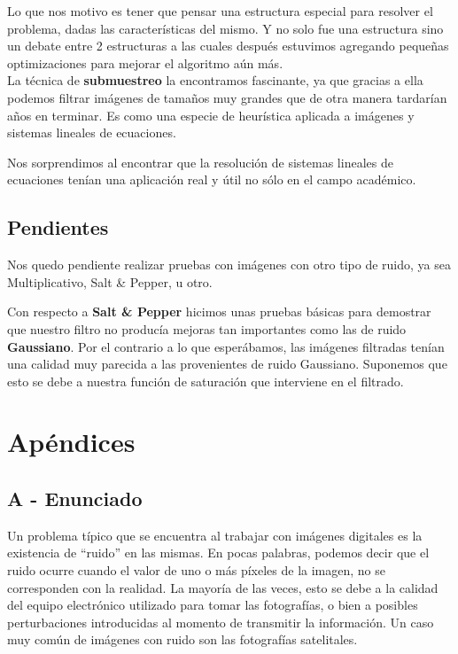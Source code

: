 \documentclass[a4paper]{article}
\begin{document}
Lo que nos motivo es tener que pensar una estructura especial para resolver el problema, dadas las características del mismo. Y no solo fue una estructura sino un debate entre 2 estructuras a las cuales después estuvimos agregando pequeñas optimizaciones para mejorar el algoritmo aún más. \\ 

La técnica de \textbf{submuestreo} la encontramos fascinante, ya que gracias a ella podemos filtrar imágenes de tamaños muy grandes que de otra manera tardarían años en terminar. Es como una especie de heurística aplicada a imágenes y sistemas lineales de ecuaciones.

Nos sorprendimos al encontrar que la resolución de sistemas lineales de ecuaciones tenían una aplicación real y útil no sólo en el campo académico. 

\subsection{Pendientes}
Nos quedo pendiente realizar pruebas con imágenes con otro tipo de ruido, ya sea Multiplicativo, Salt \& Pepper, u otro.

Con respecto a \textbf{Salt \& Pepper} hicimos unas pruebas básicas para demostrar que nuestro filtro no producía mejoras tan importantes como las de ruido \textbf{Gaussiano}. Por el contrario a lo que esperábamos, las imágenes filtradas tenían una calidad muy parecida a las provenientes de ruido Gaussiano. Suponemos que esto se debe a nuestra función de saturación que interviene en el filtrado.


\newpage

\section{Apéndices}

\subsection{A - Enunciado}

Un problema típico que se encuentra al trabajar con imágenes digitales es la existencia de ``ruido'' en las mismas. En pocas palabras, podemos decir que el ruido ocurre cuando el valor de uno o más píxeles de la imagen, no se corresponden con la realidad. La mayor\'ia de las veces, esto se debe a la calidad del equipo electr\'onico utilizado para tomar las fotograf\'ias, o bien a posibles perturbaciones introducidas al momento de transmitir la informaci\'on. Un caso muy com\'un de im\'agenes con ruido son las fotograf\'ias satelitales.
\end{document}
